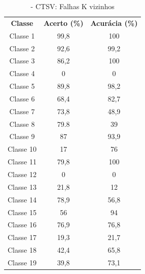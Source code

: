 \begin{itemize}
 \begin{table}[ht]
\centering
\begin{tabular}{ccc}
\textbf{Classe} & \textbf{Acerto (\%)} & \textbf{Acurácia (\%)} \\
Classe 1        & 99,8                  & 100                    \\
Classe 2        & 92,6                  & 99,2                    \\
Classe 3        & 86,2                  & 100                    \\
Classe 4        & 0                  & 0                    \\
Classe 5        & 89,8                 & 98,2                    \\
Classe 6        & 68,4                  & 82,7                    \\
Classe 7        & 73,8                  & 48,9                    \\
Classe 8        & 79.8                  & 39                    \\
Classe 9        & 87                  & 93,9                    \\
Classe 10       & 17                  & 76                    \\
Classe 11       & 79,8            & 100   
     \\
Classe 12       & 0                 & 0   
     \\
Classe 13      & 21,8                 & 12    
     \\
Classe 14       &  78,9                & 56,8   
     \\
Classe 15       & 56                 & 94
     \\
Classe 16       & 76,9                &    76,8
     \\
Classe 17       & 19,3                & 21,7
     \\
Classe 18     &  42,4              &    65,8 
     \\
Classe 19       & 39,8                 & 73,1                                
\end{tabular}
\caption{\label{tab:ctsvnKvizinhos}- CTSV: Falhas K vizinhos}
\end{table}



\end{itemize}

